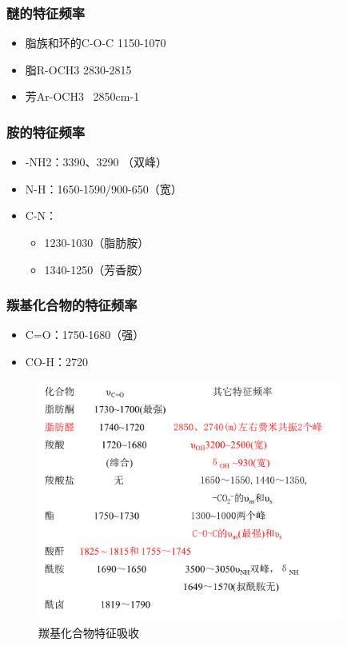 \subsubsection*{醚的特征频率}
\begin{itemize}
    \item 脂族和环的C-O-C  1150-1070
    \item 脂R-OCH3         2830-2815
    \item 芳Ar-OCH3       ~2850cm-1
\end{itemize}
\subsubsection*{ 胺的特征频率}
\begin{itemize}
    \item -NH2：3390、3290 （双峰）
    \item N-H：1650-1590/900-650（宽）
    \item C-N：
    \begin{itemize}
        \item 1230-1030（脂肪胺）
        \item 1340-1250（芳香胺）
    \end{itemize}
\end{itemize}
\subsubsection*{羰基化合物的特征频率}
\begin{itemize}
    \item C=O：1750-1680（强）
    \item CO-H：2720
\end{itemize}
\begin{figure}[ht]
    \centering
    \includegraphics[width=10cm]{image/chp5_co.png}
    \caption{羰基化合物特征吸收}
    \label{fig:chp5_co}
\end{figure}



